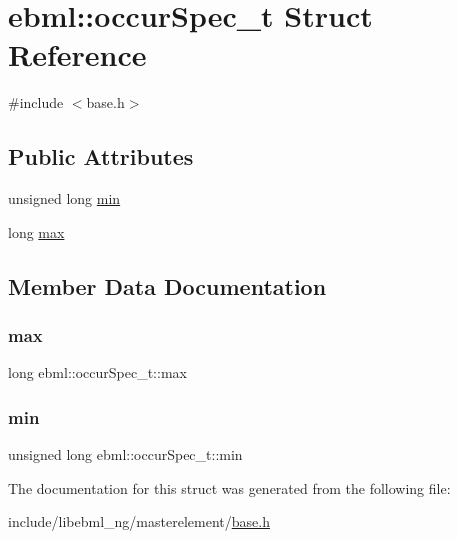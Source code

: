 \hypertarget{structebml_1_1occurSpec__t}{}\section{ebml\+:\+:occur\+Spec\+\_\+t Struct Reference}
\label{structebml_1_1occurSpec__t}


{\ttfamily \#include $<$base.\+h$>$}

\subsection*{Public Attributes}
\begin{DoxyCompactItemize}
\item 
unsigned long \mbox{\hyperlink{structebml_1_1occurSpec__t_ada17a7725f7c9d60ad50f80bef6b6b6d}{min}}
\item 
long \mbox{\hyperlink{structebml_1_1occurSpec__t_a31362ff2c93db2d5ecff3229fce488c7}{max}}
\end{DoxyCompactItemize}


\subsection{Member Data Documentation}
\mbox{\label{structebml_1_1occurSpec__t_a31362ff2c93db2d5ecff3229fce488c7}} 
\subsubsection{\texorpdfstring{max}{max}}
{\footnotesize\ttfamily long ebml\+::occur\+Spec\+\_\+t\+::max}

\mbox{\label{structebml_1_1occurSpec__t_ada17a7725f7c9d60ad50f80bef6b6b6d}} 
\subsubsection{\texorpdfstring{min}{min}}
{\footnotesize\ttfamily unsigned long ebml\+::occur\+Spec\+\_\+t\+::min}



The documentation for this struct was generated from the following file\+:\begin{DoxyCompactItemize}
\item 
include/libebml\+\_\+ng/masterelement/\mbox{\hyperlink{masterelement_2base_8h}{base.\+h}}\end{DoxyCompactItemize}
